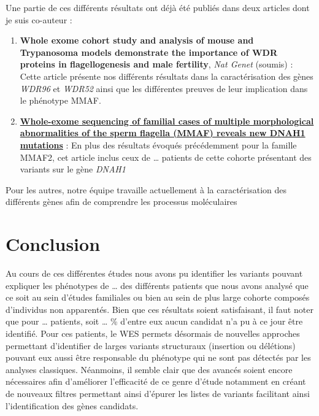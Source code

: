 \documentclass[12pt,twoside]{reedthesis}
\theoremstyle{definition}
\theoremstyle{definition}
\theoremstyle{remark}
\begin{document}
  Une partie de ces différents résultats ont déjà été publiés dans deux
  articles dont je suis co-auteur :
  
  \begin{enumerate}
  \def\labelenumi{\arabic{enumi}.}
  \item
    \textbf{Whole exome cohort study and analysis of mouse and Trypanosoma
    models demonstrate the importance of WDR proteins in flagellogenesis
    and male fertility}, \emph{Nat Genet} (soumis) : Cette article
    présente nos différents résultats dans la caractérisation des gènes
    \emph{WDR96} et \emph{WDR52} ainsi que les différentes preuves de leur
    implication dans le phénotype MMAF.
  \item
    \protect\hyperlink{famdnah1}{\textbf{Whole-exome sequencing of
    familial cases of multiple morphological abnormalities of the sperm
    flagella (MMAF) reveals new DNAH1 mutations}} : En plus des résultats
    évoqués précédemment pour la famille MMAF2, cet article inclus ceux de
    \ldots{} patients de cette cohorte présentant des variants sur le gène
    \emph{DNAH1}
  \end{enumerate}
  
  Pour les autres, notre équipe travaille actuellement à la
  caractérisation des différents gènes afin de comprendre les processus
  moléculaires
  
  \newpage
  
  \newpage
  
  \newpage 
  
  \section{Conclusion}\label{conclusion}
  
  Au cours de ces différentes études nous avons pu identifier les variants
  pouvant expliquer les phénotypes de \ldots{} des différents patients que
  nous avons analysé que ce soit au sein d'études familiales ou bien au
  sein de plus large cohorte composés d'individus non apparentés. Bien que
  ces résultats soient satisfaisant, il faut noter que pour \ldots{}
  patients, soit \ldots{} \% d'entre eux aucun candidat n'a pu à ce jour
  être identifié. Pour ces patients, le WES permets désormais de nouvelles
  approches permettant d'identifier de larges variants structuraux
  (insertion ou délétions) pouvant eux aussi être responsable du phénotype
  qui ne sont pas détectés par les analyses classiques. Néanmoins, il
  semble clair que des avancés soient encore nécessaires afin d'améliorer
  l'efficacité de ce genre d'étude notamment en créant de nouveaux filtres
  permettant ainsi d'épurer les listes de variants facilitant ainsi
  l'identification des gènes candidats.
  
\end{document}
